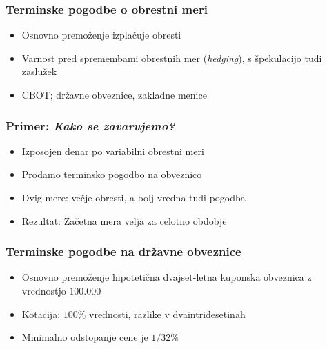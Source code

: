 \documentclass[14pt]{beamer}
\begin{document}
\begin{frame}
    \frametitle{Terminske pogodbe o obrestni meri}
    
    \begin{itemize}
        \item Osnovno premoženje izplačuje obresti
        \item Varnost pred spremembami obrestnih mer (\textit{hedging}), s 
                špekulacijo tudi zaslužek
        \item CBOT; državne obveznice, zakladne menice
    \end{itemize}


\end{frame}


\begin{frame}
    \frametitle{Primer: \textit{Kako se zavarujemo?}}
    
    \begin{itemize}
        \item Izposojen denar po variabilni obrestni meri
        \item Prodamo terminsko pogodbo na obveznico
        \item Dvig mere: večje obresti, a bolj vredna tudi pogodba
        \item Rezultat: Začetna mera velja za celotno obdobje
    \end{itemize}

    \note[item]{}

\end{frame}


\begin{frame}
    \frametitle{Terminske pogodbe na državne obveznice}
    
    \begin{itemize}
        \item Osnovno premoženje hipotetična dvajset-letna kuponska 
                obveznica z vrednostjo \textdollar$100.000$
        \item Kotacija: $100\%$ vrednosti, razlike v dvaintridesetinah
        \item Minimalno odstopanje cene je $1 / 32 \%$
    \end{itemize}


\end{frame}
\end{document}

